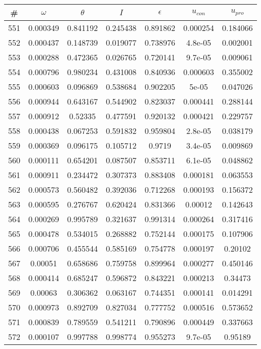 \newpage
\begin{table}
\begin{tabular}{c|c|c|c|c|c|c}
\# & $\omega$ & $\theta$ & $I$ & $\epsilon$ & $u_{con}$ & $u_{pro}$\\
\hline
551 & 0.000349 & 0.841192 & 0.245438 & 0.891862 & 0.000254 & 0.184066\\
552 & 0.000437 & 0.148739 & 0.019077 & 0.738976 & 4.8e-05 & 0.002001\\
553 & 0.000288 & 0.472365 & 0.026765 & 0.720141 & 9.7e-05 & 0.009061\\
554 & 0.000796 & 0.980234 & 0.431008 & 0.840936 & 0.000603 & 0.355002\\
555 & 0.000603 & 0.096869 & 0.538684 & 0.902205 & 5e-05 & 0.047026\\
556 & 0.000944 & 0.643167 & 0.544902 & 0.823037 & 0.000441 & 0.288144\\
557 & 0.000912 & 0.52335 & 0.477591 & 0.920132 & 0.000421 & 0.229757\\
558 & 0.000438 & 0.067253 & 0.591832 & 0.959804 & 2.8e-05 & 0.038179\\
559 & 0.000369 & 0.096175 & 0.105712 & 0.9719 & 3.4e-05 & 0.009869\\
560 & 0.000111 & 0.654201 & 0.087507 & 0.853711 & 6.1e-05 & 0.048862\\
561 & 0.000911 & 0.234472 & 0.307373 & 0.883408 & 0.000181 & 0.063553\\
562 & 0.000573 & 0.560482 & 0.392036 & 0.712268 & 0.000193 & 0.156372\\
563 & 0.000595 & 0.276767 & 0.620424 & 0.831366 & 0.00012 & 0.142643\\
564 & 0.000269 & 0.995789 & 0.321637 & 0.991314 & 0.000264 & 0.317416\\
565 & 0.000478 & 0.534015 & 0.268882 & 0.752144 & 0.000175 & 0.107906\\
566 & 0.000706 & 0.455544 & 0.585169 & 0.754778 & 0.000197 & 0.20102\\
567 & 0.00051 & 0.658686 & 0.759758 & 0.899964 & 0.000277 & 0.450146\\
568 & 0.000414 & 0.685247 & 0.596872 & 0.843221 & 0.000213 & 0.34473\\
569 & 0.00063 & 0.306362 & 0.063167 & 0.744351 & 0.000141 & 0.014291\\
570 & 0.000973 & 0.892709 & 0.827034 & 0.777752 & 0.000516 & 0.573652\\
571 & 0.000839 & 0.789559 & 0.541211 & 0.790896 & 0.000449 & 0.337663\\
572 & 0.000107 & 0.997788 & 0.998774 & 0.955273 & 9.7e-05 & 0.95189\\

\end{tabular}
\end{table}
